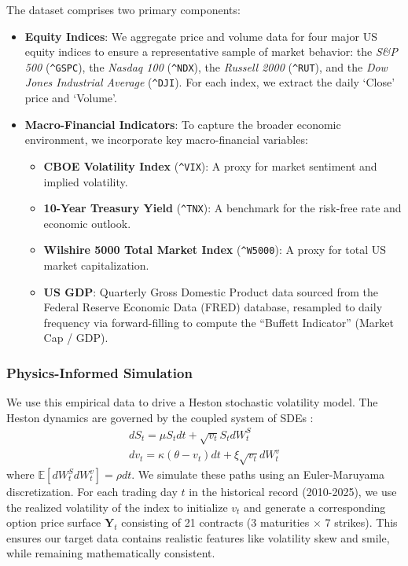 \documentclass{article}
\newcommand\parens[1]{\left( #1 \right)}
\newcommand\brac[1]{\left[ #1 \right]}
\newcommand{\bb}{\mathbb}
\begin{document}
The dataset comprises two primary components:
\begin{itemize}
    \item \textbf{Equity Indices}: We aggregate price and volume data for four major US equity indices to ensure a representative sample of market behavior: the \emph{S\&P 500} (\texttt{\^{}GSPC}), the \emph{Nasdaq 100} (\texttt{\^{}NDX}), the \emph{Russell 2000} (\texttt{\^{}RUT}), and the \emph{Dow Jones Industrial Average} (\texttt{\^{}DJI}). For each index, we extract the daily `Close' price and `Volume'.
    \item \textbf{Macro-Financial Indicators}: To capture the broader economic environment, we incorporate key macro-financial variables:
    \begin{itemize}
        \item \textbf{CBOE Volatility Index} (\texttt{\^{}VIX}): A proxy for market sentiment and implied volatility.
        \item \textbf{10-Year Treasury Yield} (\texttt{\^{}TNX}): A benchmark for the risk-free rate and economic outlook.
        \item \textbf{Wilshire 5000 Total Market Index} (\texttt{\^{}W5000}): A proxy for total US market capitalization.
        \item \textbf{US GDP}: Quarterly Gross Domestic Product data sourced from the Federal Reserve Economic Data (FRED) database, resampled to daily frequency via forward-filling to compute the ``Buffett Indicator'' (Market Cap / GDP).
    \end{itemize}
\end{itemize}

\subsubsection{Physics-Informed Simulation}
We use this empirical data to drive a Heston stochastic volatility model. The Heston dynamics are governed by the coupled system of SDEs \citep{heston1993}:
\begin{gather*}
    d S_t = \mu S_t dt + \sqrt{v_t} S_t d W_t^S \\
    d v_t = \kappa\parens{\theta - v_t} dt + \xi \sqrt{v_t} d W_t^v
\end{gather*}
where \(\bb{E}\brac{d W_t^S d W_t^v} = \rho dt\). We simulate these paths using an Euler-Maruyama discretization. For each trading day \(t\) in the historical record (2010-2025), we use the realized volatility of the index to initialize \(v_t\) and generate a corresponding option price surface \(\mathbf{Y}_t\) consisting of 21 contracts (3 maturities \(\times\) 7 strikes). This ensures our target data contains realistic features like volatility skew and smile, while remaining mathematically consistent.
\end{document}

